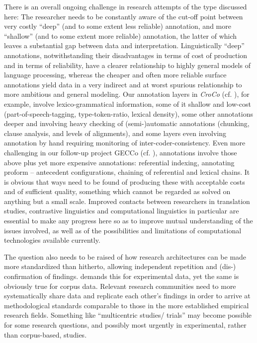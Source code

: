 \documentclass[output=paper]{LSP/langsci}
\begin{document}
\begin{exe}
\begin{exe}
\begin{exe}
\begin{exe}
\begin{exe}
There is an overall ongoing challenge in research attempts of the type discussed here: The researcher needs to be constantly aware of the cut-off point between very costly ``deep'' (and to some extent less reliable) annotation, and more ``shallow'' (and to some extent more reliable) annotation, the latter of which leaves a substantial gap between data and interpretation. Linguistically ``deep'' annotations, notwithstanding their disadvantages in terms of cost of production and in terms of reliability, have a clearer relationship to highly general models of language processing, whereas the cheaper and often more reliable surface annotations yield data in a very indirect and at worst spurious relationship to more ambitious and general modeling. Our annotation layers in \textit{CroCo} (cf. ), for example, involve lexico-grammatical information, some of it shallow and low-cost (part-of-speech-tagging, type-token-ratio, lexical density), some other annotations deeper and involving heavy checking of (semi-)automatic annotations (chunking, clause analysis, and levels of alignments), and some layers even involving annotation by hand requiring monitoring of inter-coder-consistency. Even more challenging in our follow-up project GECCo (cf. ), annotations involve those above plus yet more expensive annotations: referential indexing, annotating proform -- antecedent configurations, chaining of referential and lexical chains. It is obvious that ways need to be found of producing these with acceptable costs and of sufficient quality, something which cannot be regarded as solved on anything but a small scale. Improved contacts between researchers in translation studies, contrastive linguistics and computational linguistics in particular are essential to make any progress here so as to improve mutual understanding of the issues involved, as well as of the possibilities and limitations of computational technologies available currently.

The question also needs to be raised of how research architectures can be made more standardized than hitherto, allowing independent repetition and (dis-) confirmation of findings. \citet[176ff]{Schlesewsky2009} demands this for experimental data, yet the same is obviously true for corpus data. Relevant research communities need to more systematically share data and replicate each other's findings in order to arrive at methodological standards comparable to those in the more established empirical research fields. Something like ``multicentric studies/ trials'' may become possible for some research questions, and possibly most urgently in experimental, rather than corpus-based, studies. 


\end{exe}
\end{exe}
\end{exe}
\end{exe}
\end{exe}
\end{document}

